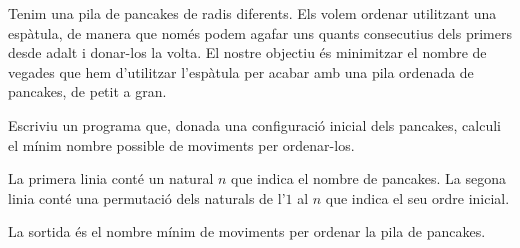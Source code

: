 

\Statement

Tenim una pila de pancakes de radis diferents. Els volem ordenar utilitzant una espàtula, de manera que només podem agafar uns quants consecutius dels primers desde adalt i donar-los la volta. El nostre objectiu és minimitzar el nombre de vegades que hem d'utilitzar l'espàtula per acabar amb una pila ordenada de pancakes, de petit a gran.

\medskip

Escriviu un programa que, donada una configuració inicial dels pancakes, calculi el mínim nombre possible de moviments per ordenar-los.

\Input

La primera linia conté un natural $n$ que indica el nombre de pancakes.
La segona linia conté una permutació dels naturals de l'$1$ al $n$ que indica el seu ordre inicial. 

\Output

La sortida és el nombre mínim de moviments per ordenar la pila de pancakes.


\SampleOneCol
